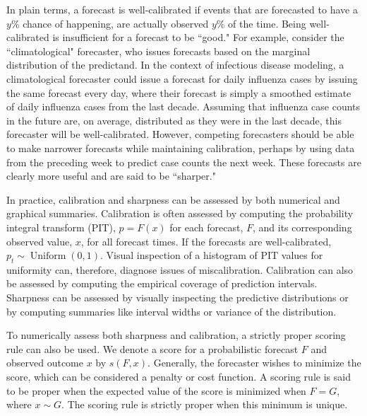 In plain terms, a forecast is well-calibrated if events that are forecasted to have a \( y \)\% chance of happening, are actually observed \( y \)\% of the time.
Being well-calibrated is insufficient for a forecast to be ``good."
For example, consider the ``climatological" forecaster, who issues forecasts based on the marginal distribution of the predictand.
In the context of infectious disease modeling, a climatological forecaster could issue a forecast for daily influenza cases by issuing the same forecast every day, where their forecast is simply a smoothed estimate of daily influenza cases from the last decade.
Assuming that influenza case counts in the future are, on average, distributed as they were in the last decade, this forecaster will be well-calibrated.
However, competing forecasters should be able to make narrower forecasts while maintaining calibration, perhaps by using data from the preceding week to predict case counts the next week.
These forecasts are clearly more useful and are said to be ``sharper."

In practice, calibration and sharpness can be assessed by both numerical and graphical summaries.
Calibration is often assessed by computing the probability integral transform (PIT), \( p = F(x) \) for each forecast, \( F \), and its corresponding observed value, \( x \), for all forecast times.
If the forecasts are well-calibrated, \( p_t \sim \operatorname{Uniform}(0,1) \).
Visual inspection of a histogram of PIT values for uniformity can, therefore, diagnose issues of miscalibration.
Calibration can also be assessed by computing the empirical coverage of prediction intervals.
Sharpness can be assessed by visually inspecting the predictive distributions or by computing summaries like interval widths or variance of the distribution.

To numerically assess both sharpness and calibration, a strictly proper scoring rule can also be used.
We denote a score for a probabilistic forecast \( F \) and observed outcome \( x \) by \( s(F, x) \).
Generally, the forecaster wishes to minimize the score, which can be considered a penalty or cost function.
A scoring rule is said to be proper when the expected value of the score is minimized when \( F = G \), where $x \sim G$.
The scoring rule is strictly proper when this minimum is unique.

